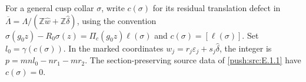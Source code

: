 \begin{definition}
\hypertarget{tag-IP11}{}\label{I:def:residual-cusp-defect}
For a general cusp collar $\sigma$, write $c(\sigma)$ for
its residual translation defect in
$\overline\Lambda=\Lambda/(\mathbb Z\widehat w+
\mathbb Z\widehat\delta)$, using the convention
$\sigma(g_0z)-R_0\sigma(z)=\Pi_c(g_0z)\ell(\sigma)$
and $c(\sigma)=[\ell(\sigma)]$.
Set $l_0=\gamma(c(\sigma))$.  In the marked coordinates
$w_j=r_j\varepsilon_j+s_j\widehat\delta$, the integer is
$p=mn l_0-nr_1-mr_2$.
The section-preserving source data of \ref{push:src:E.1.1} have $c(\sigma)=0$.
\end{definition}

